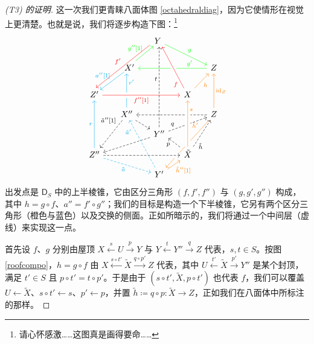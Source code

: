 \begin{proof}[(\textup{T3}) 的证明]
	这一次我们更青睐八面体图 \eqref{octahedraldiag}，因为它使情形在视觉上更清楚。也就是说，我们将逐步构造下图：\footnote{请心怀感激……这图真是画得要命……}
	\[
	\begin{tikzcd}[column sep=0.5cm, row sep=0.3cm]
		& & \mkern-6mu Y\arrow[ddddll, red, start anchor={[xshift=-1ex, yshift=-1ex]west}, end anchor={[xshift=0.5ex]north}, "f'"' ]\arrow[ddrr, green, "g"] & & \\
		& & & & \\
		& \mkern+12mu X'\arrow[uur, green, "{g''[1]}"]\arrow[ddl, cyan, start anchor={[xshift=2.5ex, yshift=-1ex]west}, end anchor={[xshift=-0.6ex, yshift=1.5ex]east}, "{a''[1]}"']\arrow[from=ddd, cyan, near end, "r'"'] & & & Z\arrow[lll, green, near start, "g'"'] \\
		& & & & \\
		Z'\arrow[rrr, red, crossing over, "{f''[1]}"'] & & & X\arrow[uuuul, red, crossing over, pos=0.2, "f"]\arrow[uur, orange, "h"'] \\
		& X''\arrow[ddl, dashed, pos=0.2, "{\tilde{a}''[1]}"']\arrow[dr, dashed] & & & Z\arrow[uuu, orange, "\text{id}_Z"']\arrow[lll, dashed]\arrow[dddll, orange, pos=0.2, "\tilde{h}'"'] \\
		& & Y''\arrow[urr, dashed, pos=0.2, "q"]\arrow[uuuuuu, dashed, pos=0.6, "t"] & & \\
		Z''\arrow[uuu, cyan, "r"]\arrow[rrr, dashed, crossing over]\arrow[drr, cyan, dashed, "\tilde{a}"']\arrow[from=urr, dashed, crossing over] & & & \tilde{X}\arrow[uuu, orange, crossing over, pos=0.8, "s"']\arrow[uur, dashed, pos=0.2, "\tilde{h}"']\arrow[ul, dashed, pos=0.7, end anchor={[yshift=-1ex]east}, "p"] & \\
		& & Y'\arrow[uuul, dashed, cyan, pos=0.85, "\tilde{a}'"]\arrow[ur, orange, "{\tilde{h}''[1]}"'] & & 
	\end{tikzcd}
	\]
	出发点是 $\mathsf{D}_S$ 中的上半棱锥，它由区分三角形 $(f,f',f'')$ 与 $(g,g',g'')$ 构成，其中 $h=g\circ f$、$a''=f'\circ g''$；我们的目标是构造一个下半棱锥，它另有两个区分三角形（橙色与蓝色）以及交换的侧面。正如所暗示的，我们将通过一个中间层（虚线）来实现这一点。
	
	首先设 $f$、$g$ 分别由屋顶 $X\xleftarrow{s} U\xrightarrow{p} Y$ 与 $Y\xleftarrow{t}Y''\xrightarrow{q} Z$ 代表，$s,t\in S$。按图 \eqref{roofcompo}，$h=g\circ f$ 由 $X\xleftarrow{s\circ t'} \tilde{X}\xrightarrow{q\circ p'} Z$ 代表，其中 $U\xleftarrow{t'}\tilde{X}\xrightarrow{p'} Y''$ 是某个封顶，满足 $t'\in S$ 且 $p\circ t'=t\circ p'$。于是由于 $(s\circ t', \tilde{X}, p\circ t')$ 也代表 $f$，我们可以覆盖 $U\leftarrow\tilde{X}$、$s\circ t'\leftarrow s$、$p'\leftarrow p$，并置 $\tilde{h}\coloneqq q\circ p:\tilde{X}\rightarrow Z$，正如我们在八面体中所标注的那样。
	

\end{proof}
